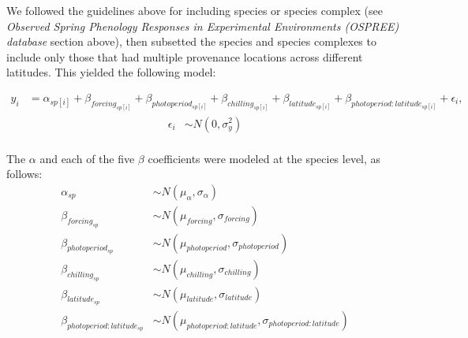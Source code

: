 \documentclass{article}
\begin{document}
\begin{enumerate}
\par We followed the guidelines above for including species or species complex (see \emph{Observed Spring Phenology Responses in Experimental Environments (OSPREE) database} section above), then subsetted the species and species complexes to include only those that had multiple provenance locations across different latitudes. This yielded the following model:

\begin{align*}
y_i &= \alpha_{sp[i]} + \beta_{forcing_{sp[i]}} + \beta_{photoperiod_{sp[i]}} + \beta_{chilling_{sp[i]}} + \beta_{latitude_{sp[i]}} + \beta_{photoperiod : latitude_{sp[i]}} + \epsilon_i,
\end{align*}
\begin{align*}
\epsilon_i & \sim N(0,\sigma^2_y) \\
\end{align*}

\noindent The $\alpha$ and each of the five $\beta$ coefficients were modeled at the species level, as follows:
\begin{align*}
\alpha_{sp} & \sim N(\mu_{\alpha}, \sigma_{\alpha}) \\
\beta_{forcing_{sp}} & \sim N(\mu_{forcing}, \sigma_{forcing}) \\
\beta_{photoperiod_{sp}} & \sim N(\mu_{photoperiod}, \sigma_{photoperiod})\\
\beta_{chilling_{sp}} & \sim N(\mu_{chilling}, \sigma_{chilling})\\
\beta_{latitude_{sp}} & \sim N(\mu_{latitude}, \sigma_{latitude})\\
\beta_{photoperiod : latitude_{sp}} & \sim N(\mu_{photoperiod : latitude}, \sigma_{photoperiod : latitude})
\end{align*}


\end{enumerate}
\end{document}
